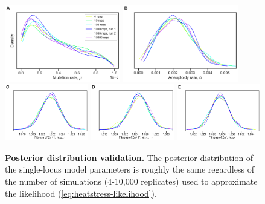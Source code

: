 \documentclass[12pt]{extarticle}
\begin{document}
\begin{figure}[h]
    \centering
      \includegraphics[width=0.45\textwidth]{../figures/runs-A.pdf}      
      \includegraphics[width=0.45\textwidth]{../figures/runs-B.pdf}    
      \includegraphics[width=0.325\textwidth]{../figures/runs-C.pdf}      
      \includegraphics[width=0.325\textwidth]{../figures/runs-D.pdf}      
      \includegraphics[width=0.325\textwidth]{../figures/runs-E.pdf} 
       \caption{
    \textbf{Posterior distribution validation.}
    The posterior distribution of the single-locus model parameters is roughly the same regardless of the number of simulations (4-10,000 replicates) used to approximate the likelihood (\autoref{eq:heatstress-likelihood}).
    } 
     
     \label{fig:seeds}
 \end{figure}
\end{document}
